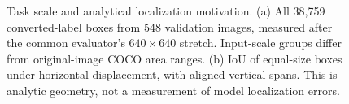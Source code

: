 \begin{figure}[t]
\centering
\visualMotivation{\textwidth}
\caption{Task scale and analytical localization motivation. (a) All 38,759 converted-label boxes from 548 validation images, measured after the common evaluator's $640\times640$ stretch. Input-scale groups differ from original-image COCO area ranges. (b) IoU of equal-size boxes under horizontal displacement, with aligned vertical spans. This is analytic geometry, not a measurement of model localization errors.}
\label{fig:motivation}
\end{figure}
